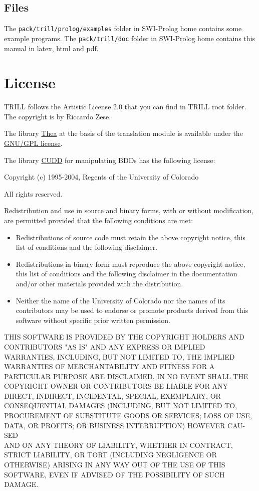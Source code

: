 \documentclass[a4paper,10pt]{scrartcl}
\begin{document}
\subsection{Files}
The \texttt{pack/trill/prolog/examples} folder in SWI-Prolog home contains some example programs.
The \texttt{pack/trill/doc} folder in SWI-Prolog home contains this manual in latex, html and pdf.


\section{License}
\label{license}



TRILL follows the Artistic License 2.0 that you can find in TRILL root folder. The copyright is by Riccardo Zese.
\vspace{3mm}

The library \href{http://vangelisv.github.io/thea/}{Thea} at the basis of the translation module is available under the \href{http://www.gnu.org/copyleft/gpl.html}{GNU/GPL license}.

The library \href{http://vlsi.colorado.edu/\string ~fabio/}{CUDD} for manipulating BDDs has the following license:

\vspace{3mm}

Copyright (c) 1995-2004, Regents of the University of Colorado

All rights reserved.

Redistribution and use in source and binary forms, with or without
modification, are permitted provided that the following conditions
are met:

\begin{itemize}
\item
Redistributions of source code must retain the above copyright
notice, this list of conditions and the following disclaimer.
\item
Redistributions in binary form must reproduce the above copyright
notice, this list of conditions and the following disclaimer in the
documentation and/or other materials provided with the distribution.
\item
Neither the name of the University of Colorado nor the names of its
contributors may be used to endorse or promote products derived from
this software without specific prior written permission.
\end{itemize}
THIS SOFTWARE IS PROVIDED BY THE COPYRIGHT HOLDERS AND CONTRIBUTORS
"AS IS" AND ANY EXPRESS OR IMPLIED WARRAN\-TIES, INCLUDING, BUT NOT
LIMITED TO, THE IMPLIED WARRANTIES OF MERCHANTABILITY AND FITNESS
FOR A PARTICULAR PURPOSE ARE DISCLAIMED. IN NO EVENT SHALL THE
COPYRIGHT OWNER OR CONTRIBUTORS BE LIABLE FOR ANY DIRECT, INDIRECT,
INCIDENTAL, SPECIAL, EXEMPLARY, OR CONSEQUENTIAL DAMAGES (INCLUDING,
BUT NOT LIMITED TO, PROCUREMENT OF SUBSTITUTE GOODS OR SERVICES;
LOSS OF USE, DATA, OR PROFITS; OR BUSINESS INTERRUPTION) HOWEVER
CAU-SED
\\ AND ON ANY THEORY OF LIABILITY, WHETHER IN CONTRACT, STRICT
LIABILITY, OR TORT (INCLUDING NEGLIGENCE OR OTHERWISE) ARISING IN
ANY WAY OUT OF THE USE OF THIS SOFTWARE, EVEN IF ADVISED OF THE
POSSIBILITY OF SUCH DAMAGE.




\end{document}
